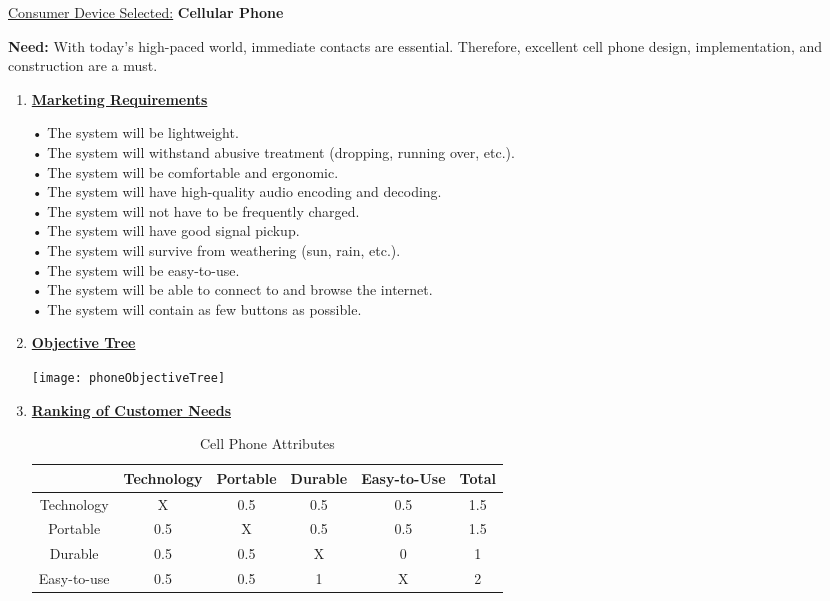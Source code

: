 \begin{enumerate}
\begin{onlysolution}
  \underline{Consumer Device Selected:} \textbf{Cellular Phone}
  
  \textbf{Need:} With today’s high-paced world, immediate contacts are essential. Therefore,
  excellent cell phone design, implementation, and construction are a must.
  \begin{enumerate}
  \def\labelenumi{\arabic{enumi}.}
    \item \underline{\textbf{Marketing Requirements}}
    
• The system will be lightweight.\\
• The system will withstand abusive treatment (dropping, running over, etc.).\\
• The system will be comfortable and ergonomic.\\
• The system will have high-quality audio encoding and decoding.\\
• The system will not have to be frequently charged.\\
• The system will have good signal pickup.\\
• The system will survive from weathering (sun, rain, etc.).\\
• The system will be easy-to-use.\\
• The system will be able to connect to and browse the internet.\\
• The system will contain as few buttons as possible.

    \item \underline{\textbf{Objective Tree}}

	\texttt{[image: phoneObjectiveTree]}

 
   \item \underline{\textbf{Ranking of Customer Needs}}   
    \begin{table}
    \caption{Cell Phone Attributes}
    \begin{tabular}{c|c|c|c|c|c}
    				& Technology	& Portable	& Durable	& Easy-to-Use 	& Total			\\ \hline    			
	Technology	& X 			& 0.5		& 0.5		& 0.5			& 1.5 			\\ \hline    			
	Portable		& 0.5 			& X			& 0.5		& 0.5			& 1.5	 			\\ \hline    			
	Durable		&  0.5			& 0.5		& X			& 0				& 1 			\\ \hline    			    
	Easy-to-use	&  0.5			& 	0.5		& 1			& 	X			& 2 			\\ \hline    			
	\end{tabular}
	\end{table}



\end{enumerate}
\end{onlysolution}
\end{enumerate}
